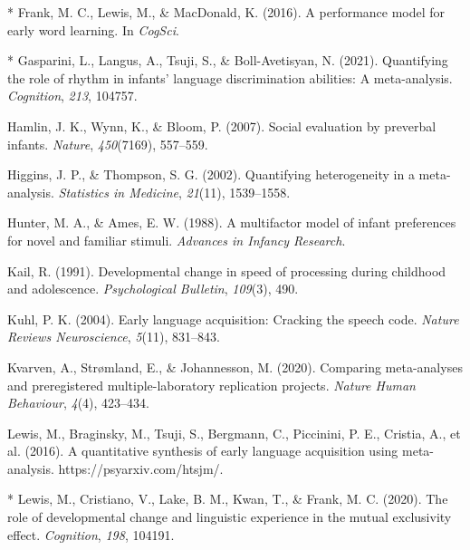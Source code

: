 \documentclass[10pt, letterpaper]{article}
\newenvironment{CSLReferences}%
  {}%
  {\par}
\begin{document}
\begin{CSLReferences}
\leavevmode{}%
* Frank, M. C., Lewis, M., \& MacDonald, K. (2016). A performance model
for early word learning. In \emph{CogSci}.

\leavevmode{}%
* Gasparini, L., Langus, A., Tsuji, S., \& Boll-Avetisyan, N. (2021).
Quantifying the role of rhythm in infants' language discrimination
abilities: A meta-analysis. \emph{Cognition}, \emph{213}, 104757.

\leavevmode{}%
Hamlin, J. K., Wynn, K., \& Bloom, P. (2007). Social evaluation by
preverbal infants. \emph{Nature}, \emph{450}(7169), 557--559.

\leavevmode{}%
Higgins, J. P., \& Thompson, S. G. (2002). Quantifying heterogeneity in
a meta-analysis. \emph{Statistics in Medicine}, \emph{21}(11),
1539--1558.

\leavevmode{}%
Hunter, M. A., \& Ames, E. W. (1988). A multifactor model of infant
preferences for novel and familiar stimuli. \emph{Advances in Infancy
Research}.

\leavevmode{}%
Kail, R. (1991). Developmental change in speed of processing during
childhood and adolescence. \emph{Psychological Bulletin}, \emph{109}(3),
490.

\leavevmode{}%
Kuhl, P. K. (2004). Early language acquisition: Cracking the speech
code. \emph{Nature Reviews Neuroscience}, \emph{5}(11), 831--843.

\leavevmode{}%
Kvarven, A., Strømland, E., \& Johannesson, M. (2020). Comparing
meta-analyses and preregistered multiple-laboratory replication
projects. \emph{Nature Human Behaviour}, \emph{4}(4), 423--434.

\leavevmode{}%
Lewis, M., Braginsky, M., Tsuji, S., Bergmann, C., Piccinini, P. E.,
Cristia, A., et al. (2016). A quantitative synthesis of early language
acquisition using meta-analysis. https://psyarxiv.com/htsjm/.

\leavevmode{}%
* Lewis, M., Cristiano, V., Lake, B. M., Kwan, T., \& Frank, M. C.
(2020). The role of developmental change and linguistic experience in
the mutual exclusivity effect. \emph{Cognition}, \emph{198}, 104191.


\end{CSLReferences}
\end{document}
